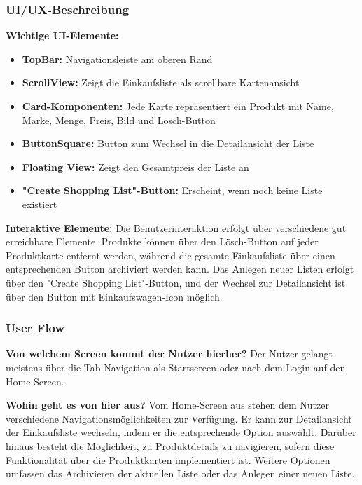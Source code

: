 \documentclass[12pt, a4paper]{report} %
\begin{document}
\subsubsection{UI/UX-Beschreibung}

\textbf{Wichtige UI-Elemente:}
\begin{itemize}
    \item \textbf{TopBar:} Navigationsleiste am oberen Rand
    \item \textbf{ScrollView:} Zeigt die Einkaufsliste als scrollbare Kartenansicht
    \item \textbf{Card-Komponenten:} Jede Karte repräsentiert ein Produkt mit Name, Marke, Menge, Preis, Bild und Lösch-Button
    \item \textbf{ButtonSquare:} Button zum Wechsel in die Detailansicht der Liste
    \item \textbf{Floating View:} Zeigt den Gesamtpreis der Liste an
    \item \textbf{"Create Shopping List"-Button:} Erscheint, wenn noch keine Liste existiert
\end{itemize}

\noindent\textbf{Interaktive Elemente:}
Die Benutzerinteraktion erfolgt über verschiedene gut erreichbare Elemente. Produkte können über den Lösch-Button auf jeder Produktkarte entfernt werden, während die gesamte Einkaufsliste über einen entsprechenden Button archiviert werden kann. Das Anlegen neuer Listen erfolgt über den "Create Shopping List"-Button, und der Wechsel zur Detailansicht ist über den Button mit Einkaufswagen-Icon möglich.

\subsubsection{User Flow}

\textbf{Von welchem Screen kommt der Nutzer hierher?}
Der Nutzer gelangt meistens über die Tab-Navigation als Startscreen oder nach dem Login auf den Home-Screen.

\noindent\textbf{Wohin geht es von hier aus?}
Vom Home-Screen aus stehen dem Nutzer verschiedene Navigationsmöglichkeiten zur Verfügung. Er kann zur Detailansicht der Einkaufsliste wechseln, indem er die entsprechende Option auswählt. Darüber hinaus besteht die Möglichkeit, zu Produktdetails zu navigieren, sofern diese Funktionalität über die Produktkarten implementiert ist. Weitere Optionen umfassen das Archivieren der aktuellen Liste oder das Anlegen einer neuen Liste.
\end{document}
